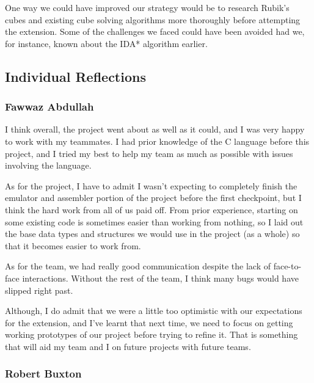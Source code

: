 \documentclass[8pt]{article}
\begin{document}
One way we could have improved our strategy would be to research Rubik's cubes and
existing cube solving algorithms more thoroughly before attempting the extension.
Some of the challenges we faced could have been avoided had we, for instance, known about
the IDA* algorithm earlier.

\subsection{Individual Reflections}

\subsubsection{Fawwaz Abdullah}

I think overall, the project went about as well as it could, and I was very happy to work with my teammates.
I had prior knowledge of the C language before this project, and I tried my best to help my team as much as possible with issues involving the language.

As for the project, I have to admit I wasn't expecting to completely finish the emulator and assembler portion of the project before the first checkpoint, but I think the hard work from all of us paid off.
From prior experience, starting on some existing code is sometimes easier than working from nothing, so I laid out the base data types and structures we would use in the project (as a whole) so that it becomes easier to work from.

As for the team, we had really good communication despite the lack of face-to-face interactions.
Without the rest of the team, I think many bugs would have slipped right past.

Although, I do admit that we were a little too optimistic with our expectations for the extension, and I've learnt that next time, we need to focus on getting working prototypes of our project before trying to refine it.
That is something that will aid my team and I on future projects with future teams.

\subsubsection{Robert Buxton}
\end{document}
